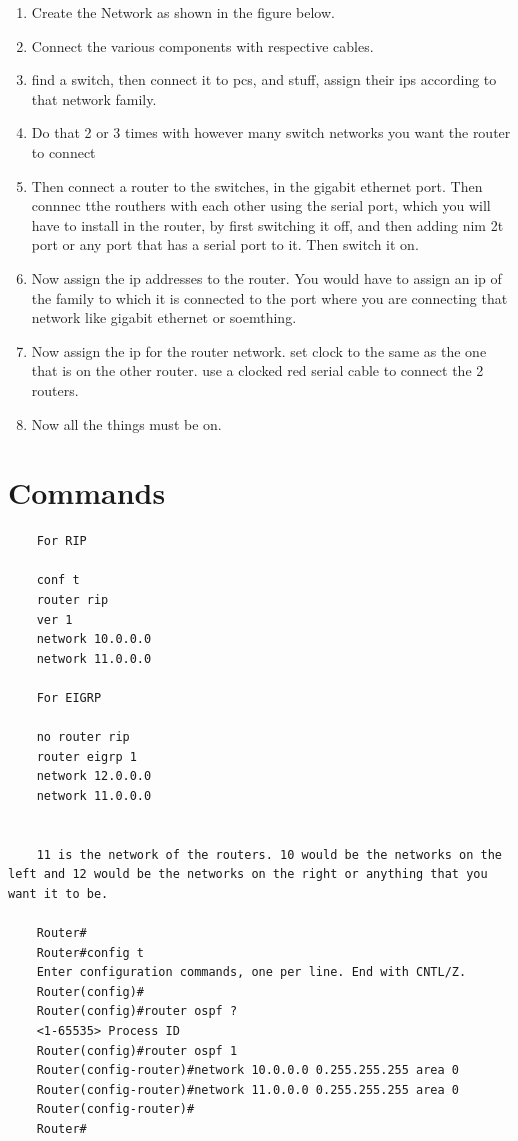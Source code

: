 \documentclass[11pt]{article}
\begin{document}
\begin{enumerate}
	\item Create the Network as shown in the figure below.
	\item Connect the various components with respective cables. 
	\item find a switch, then connect it to pcs, and stuff, assign their ips according to that network family.
	\item Do that 2 or 3 times with however many switch networks you want the router to connect
	\item Then connect a router to the switches, in the gigabit ethernet port. Then connnec tthe routhers with each other using the serial port, which you will have to install in the router, by first switching it off, and then adding nim 2t port or any port that has a serial port to it. Then switch it on.
	\item Now assign the ip addresses to the router. You would have to assign an ip of the family to which it is connected to the port where you are connecting that network like gigabit ethernet or soemthing.
	\item Now assign the ip for the router network. set clock to the same as the one that is on the other router. use a clocked red serial cable to connect the 2 routers.
	\item Now all the things must be on.
	
\end{enumerate}

\section{Commands}

\begin{verbatim}
	For RIP

	conf t
	router rip
	ver 1
	network 10.0.0.0
	network 11.0.0.0

	For EIGRP

	no router rip
	router eigrp 1
	network 12.0.0.0
	network 11.0.0.0


	11 is the network of the routers. 10 would be the networks on the left and 12 would be the networks on the right or anything that you want it to be.

	Router#
	Router#config t
	Enter configuration commands, one per line. End with CNTL/Z.
	Router(config)#
	Router(config)#router ospf ?
	<1-65535> Process ID
	Router(config)#router ospf 1
	Router(config-router)#network 10.0.0.0 0.255.255.255 area 0
	Router(config-router)#network 11.0.0.0 0.255.255.255 area 0
	Router(config-router)#
	Router#


\end{verbatim}
\end{document}
